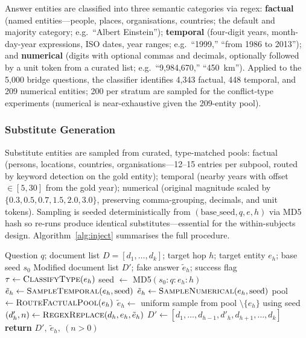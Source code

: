 Answer entities are classified into three semantic categories via regex: \textbf{factual} (named entities---people, places, organisations, countries; the default and majority category; e.g.\ ``Albert Einstein''); \textbf{temporal} (four-digit years, month-day-year expressions, ISO dates, year ranges; e.g.\ ``1999,'' ``from 1986 to 2013''); and \textbf{numerical} (digits with optional commas and decimals, optionally followed by a unit token from a curated list; e.g.\ ``9,984,670,'' ``450~km''). Applied to the 5{,}000 bridge questions, the classifier identifies 4{,}343 factual, 448 temporal, and 209 numerical entities; 200 per stratum are sampled for the conflict-type experiments (numerical is near-exhaustive given the 209-entity pool).

\subsubsection{Substitute Generation}

Substitute entities are sampled from curated, type-matched pools: factual (persons, locations, countries, organisations---12--15 entries per subpool, routed by keyword detection on the gold entity); temporal (nearby years with offset $\in [5, 30]$ from the gold year); numerical (original magnitude scaled by $\{0.3, 0.5, 0.7, 1.5, 2.0, 3.0\}$, preserving comma-grouping, decimals, and unit tokens). Sampling is seeded deterministically from $(\text{base\_seed}, q, e, h)$ via MD5 hash so re-runs produce identical substitutes---essential for the within-subjects design. Algorithm~\ref{alg:inject} summarises the full procedure.

\begin{algorithm}[!ht]
\caption{Conflict Injection via Entity Substitution (Phase 2)}
\label{alg:inject}
\begin{algorithmic}[1]
\Require Question $q$; document list $D = [d_1, \ldots, d_k]$; target hop $h$; target entity $e_h$; base seed $s_0$
\Ensure Modified document list $D'$; fake answer $\tilde{e}_h$; success flag
\State $\tau \gets \textsc{ClassifyType}(e_h)$ 
\State seed $\gets$ MD5$(s_0 : q : e_h : h)$ 
    \State $\tilde{e}_h \gets \textsc{SampleTemporal}(e_h, \text{seed})$ 
    \State $\tilde{e}_h \gets \textsc{SampleNumerical}(e_h, \text{seed})$ 
\Else
    \State pool $\gets \textsc{RouteFactualPool}(e_h)$ 
    \State $\tilde{e}_h \gets$ uniform sample from pool $\setminus \{e_h\}$ using seed
\EndIf
\State $(d'_h, n) \gets \textsc{RegexReplace}(d_h, e_h, \tilde{e}_h)$ 
\State $D' \gets [d_1, \ldots, d_{h-1}, d'_h, d_{h+1}, \ldots, d_k]$
\State \textbf{return} $D',\ \tilde{e}_h,\ (n > 0)$
\end{algorithmic}
\end{algorithm}

